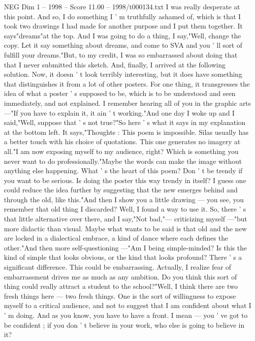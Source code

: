 \begin{textsample}{NEG Dim 1 – 1998 – Score 11.00 – 1998/t000134.txt}
I was really desperate at this point.
And so, I do something I ' m truthfully ashamed of, which is that I took two drawings I had made for another purpose and I put them together.
It says"dreams"at the top.
And I was going to do a thing, I say,"Well, change the copy.
Let it say something about dreams, and come to SVA and you ' ll sort of fulfill your dreams."But, to my credit, I was so embarrassed about doing that that I never submitted this sketch.
And, finally, I arrived at the following solution.
Now, it doesn ' t look terribly interesting, but it does have something that distinguishes it from a lot of other posters.
For one thing, it transgresses the idea of what a poster ' s supposed to be, which is to be understood and seen immediately, and not explained.
I remember hearing all of you in the graphic arts —"If you have to explain it, it ain ' t working."And one day I woke up and I said,"Well, suppose that ' s not true?"So here ' s what it says in my explanation at the bottom left.
It says,"Thoughts : This poem is impossible.
Silas usually has a better touch with his choice of quotations.
This one generates no imagery at all."I am now exposing myself to my audience, right?
Which is something you never want to do professionally."Maybe the words can make the image without anything else happening.
What ' s the heart of this poem?
Don ' t be trendy if you want to be serious.
Is doing the poster this way trendy in itself?
I guess one could reduce the idea further by suggesting that the new emerges behind and through the old, like this."And then I show you a little drawing — you see, you remember that old thing I discarded?
Well, I found a way to use it.
So, there ' s that little alternative over there, and I say,"Not bad,"— criticizing myself —"but more didactic than visual.
Maybe what wants to be said is that old and the new are locked in a dialectical embrace, a kind of dance where each defines the other."And then more self-questioning —"Am I being simple-minded?
Is this the kind of simple that looks obvious, or the kind that looks profound?
There ' s a significant difference.
This could be embarrassing.
Actually, I realize fear of embarrassment drives me as much as any ambition.
Do you think this sort of thing could really attract a student to the school?"Well, I think there are two fresh things here — two fresh things.
One is the sort of willingness to expose myself to a critical audience, and not to suggest that I am confident about what I ' m doing.
And as you know, you have to have a front.
I mean — you ' ve got to be confident ; if you don ' t believe in your work, who else is going to believe in it?

\end{textsample}
